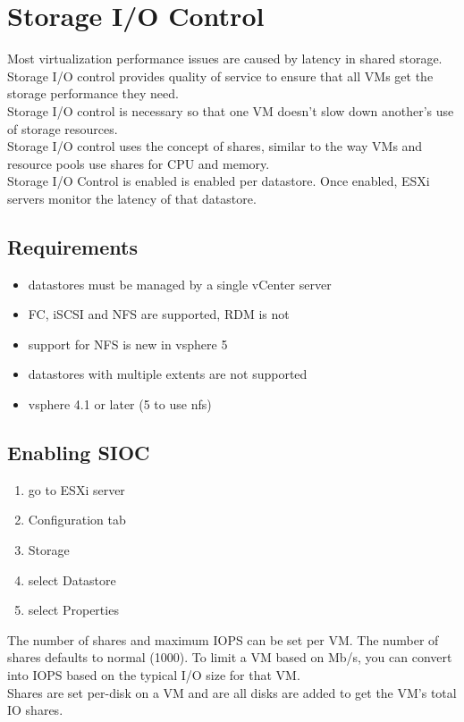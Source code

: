 \section{Storage I/O Control}

Most virtualization performance issues are caused by latency in shared
storage. Storage I/O control provides quality of service to ensure that all
VMs get the storage performance they need.\\

Storage I/O control is necessary so that one VM doesn't slow down another's
use of storage resources.\\

Storage I/O control uses the concept of shares, similar to the way VMs
and resource pools use shares for CPU and memory.\\

Storage I/O Control is enabled is enabled per datastore. Once enabled, ESXi
servers monitor the latency of that datastore.

\subsection{Requirements}

\begin{itemize}
\item datastores must be managed by a single vCenter server
\item FC, iSCSI and NFS are supported, RDM is not
\item support for NFS is new in vsphere 5
\item datastores with multiple extents are not supported
\item vsphere 4.1 or later (5 to use nfs)
\end{itemize}

\subsection{Enabling SIOC}

\begin{enumerate}
\item go to ESXi server
\item Configuration tab
\item Storage
\item select Datastore
\item select Properties
\end{enumerate}

The number of shares and maximum IOPS can be set per VM. The number of shares
defaults to normal (1000). To limit a VM based on Mb/s, you can convert into
IOPS based on the typical I/O size for that VM.\\

Shares are set per-disk on a VM and are all disks are added to get the VM's
total IO shares.
